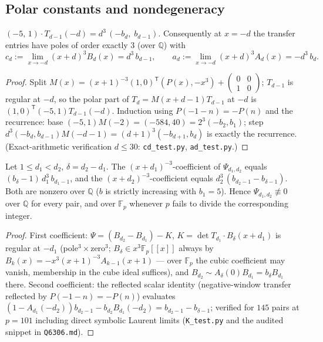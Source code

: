 \subsection{Polar constants and nondegeneracy}

\begin{lemma}\label{lem:polar}
$(-5,\,1)\cdot T_{d-1}(-d)=d^3\,(-b_d,\;b_{d-1})$.  Consequently at $x=-d$ the
transfer entries have poles of order exactly $3$ (over $\mathbb Q$) with
\[
c_d:=\lim_{x\to-d}(x+d)^3B_d(x)=d^3\,b_{d-1},\qquad
a_d:=\lim_{x\to-d}(x+d)^3A_d(x)=-d^3\,b_d .
\]
\end{lemma}

\begin{proof}
Split $M(x)=(x+1)^{-3}(1,0)^{\mathsf T}(P(x),-x^3)+\left(\begin{smallmatrix}0&0\\1&0\end{smallmatrix}\right)$;
$T_{d-1}$ is regular at $-d$, so the polar part of $T_d=M(x+d-1)T_{d-1}$ at
$-d$ is $(1,0)^{\mathsf T}(-5,1)T_{d-1}(-d)$.  Induction using
$P(-1-n)=-P(n)$ and the recurrence: base
$(-5,1)M(-2)=(-584,40)=2^3(-b_2,b_1)$; step
$d^3(-b_d,b_{d-1})M(-d-1)=(d+1)^3(-b_{d+1},b_d)$ is exactly the recurrence.
(Exact-arithmetic verification $d\le30$: \texttt{cd\_test.py}, \texttt{ad\_test.py}.)
\end{proof}

\begin{lemma}\label{lem:witness}
Let $1\le d_1<d_2$, $\delta=d_2-d_1$.  The $(x+d_1)^{-3}$-coefficient of
$\Psi_{d_1,d_2}$ equals $(b_\delta-1)\,d_1^3\,b_{d_1-1}$, and the
$(x+d_2)^{-3}$-coefficient equals $d_2^3\,(b_{d_2-1}-b_{\delta-1})$.
Both are nonzero over $\mathbb Q$ ($b$ is strictly increasing with $b_1=5$).
Hence $\Psi_{d_1,d_2}\not\equiv0$ over $\mathbb Q$ for every pair, and over
$\mathbb F_p$ whenever $p$ fails to divide the corresponding integer.
\end{lemma}

\begin{proof}
First coefficient: $\Psi=(B_{d_2}-B_{d_1})-K$, $K=\det T_{d_1}\cdot
B_\delta(x+d_1)$ is regular at $-d_1$ (pole$^3\times$zero$^3$;
$B_\delta\in x^3\mathbb F_p[[x]]$ always by $B_k(x)=-x^3(x+1)^{-3}A_{k-1}(x+1)$
— over $\mathbb F_p$ the cubic coefficient may vanish, membership in the cube
ideal suffices), and $B_{d_2}\sim A_\delta(0)B_{d_1}=b_\delta B_{d_1}$ there.
Second coefficient: the reflected scalar identity (negative-window transfer
reflected by $P(-1-n)=-P(n)$) evaluates
$(1-A_{d_1}(-d_2))b_{d_2-1}-b_{d_2}B_{d_1}(-d_2)=b_{d_2-1}-b_{\delta-1}$;
verified for $145$ pairs at $p=101$ including direct symbolic Laurent limits
(\texttt{K\_test.py} and the audited snippet in \texttt{Q6306.md}).
\end{proof}


